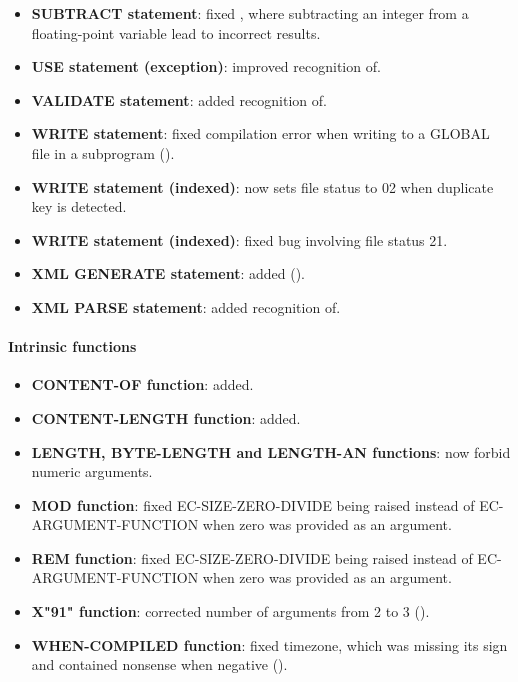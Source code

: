 \begin{itemize}
\item \textbf{SUBTRACT statement}: fixed , where subtracting an integer from a floating-point variable lead to incorrect results.
\item \textbf{USE statement (exception)}: improved recognition of.
\item \textbf{VALIDATE statement}: added recognition of.
\item \textbf{WRITE statement}: fixed compilation error when writing to a GLOBAL file in a subprogram ().
\item \textbf{WRITE statement (indexed)}: now sets file status to 02 when duplicate key is detected.
\item \textbf{WRITE statement (indexed)}: fixed bug involving file status 21.
\item \textbf{XML GENERATE statement}: added ().
\item \textbf{XML PARSE statement}: added recognition of.
\end{itemize}

\paragraph{Intrinsic functions}
\begin{itemize}
\item \textbf{CONTENT-OF function}: added.
\item \textbf{CONTENT-LENGTH function}: added.
\item \textbf{LENGTH, BYTE-LENGTH and LENGTH-AN functions}: now forbid numeric arguments.
\item \textbf{MOD function}: fixed EC-SIZE-ZERO-DIVIDE being raised instead of EC-ARGUMENT-FUNCTION when zero was provided as an argument.
\item \textbf{REM function}: fixed EC-SIZE-ZERO-DIVIDE being raised instead of EC-ARGUMENT-FUNCTION when zero was provided as an argument.
\item \textbf{X"91" function}: corrected number of arguments from 2 to 3 ().
\item \textbf{WHEN-COMPILED function}: fixed timezone, which was missing its sign and contained nonsense when negative ().
\end{itemize}

